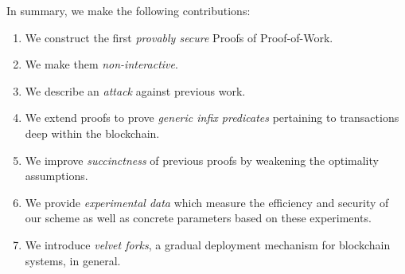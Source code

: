 In summary, we make the following contributions:
\begin{enumerate}
  \item We construct the first \emph{provably secure} Proofs of Proof-of-Work.
  \item We make them \emph{non-interactive}.
  \item We describe an \emph{attack} against previous work.
  \item We extend proofs to prove \emph{generic infix predicates} pertaining to
        transactions deep within the blockchain.
  \item We improve \emph{succinctness} of previous proofs by weakening the
        optimality assumptions.
  \item We provide \emph{experimental data} which measure the efficiency and
        security of our scheme as well as concrete parameters based on these
        experiments.
  \item We introduce \emph{velvet forks}, a gradual deployment mechanism for
        blockchain systems, in general.
\end{enumerate}
